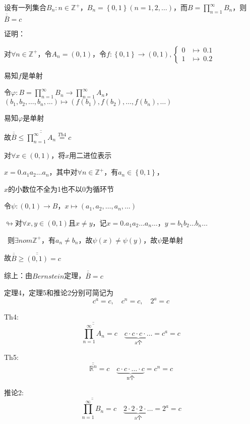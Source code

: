 \begin{la}
设有一列集合$B_{n} : n \in \mathbb{Z}^{+}$，$B_{n} = \left\{0,1\right\} \left(n = 1,2,\dots\right) $，而$B = \prod \limits_{n=1}^{\infty}B_{n}$，则$\overline{\overline{B}} = c$    
\end{la}
\noindent 证明：
\par {} 对$\forall n \in \mathbb{Z}^{+}$，令$A_{n} = \left(0,1\right) $，令$f : \left\{0,1\right\} \to \left(0,1\right) ,
\begin{cases}
    0 &\mapsto \ 0.1  \\
    1 &\mapsto \ 0.2
\end{cases} $
\par 易知$f$是单射
\par 令$\varphi :B = \prod \limits_{n=1}^{\infty}B_{n} \to \prod \limits_{n=1}^{\infty}A_{n}$，$\left( b_{1},b_{2},\dots,b_{n},\dots \right)\mapsto \left(f(b_{1}),f(b_{2}),\dots,f(b_{n}),\dots\right) $
\par 易知$\varphi$是单射
\par 故$\overline{\overline{B}} \leqslant \overline{\overline{\prod \limits_{n=1}^{\infty}A_{n}}} \stackrel{Th4}{=} c$
\par {} 对$\forall x \in \left(0,1\right) $，将$x$用二进位表示
\par \quad $x = 0.a_{1}a_{2}\dots a_{n}$，其中对$\forall n \in \mathbb{Z}^{+}$，有$a_{n} \in \left\{0,1\right\} $，
\par \quad $x$的小数位不全为1也不以0为循环节
\par \quad 令$\psi : \left(0,1\right) \to B$，$x \mapsto \left(a_{1},a_{2},\dots,a_{n},\dots\right) $
\par \quad $\looparrowright $对$\forall x , y \in \left(0,1\right) $且$x \neq y$，记$x = 0.a_{1}a_{2}\dots a_{n}\dots$，$y = b_{1}b_{2}\dots b_{n}\dots$
\par \quad \quad \ 则$\exists n om \mathbb{Z}^{+}$，有$a_{n} \neq b_{n}$，故$\psi (x) \neq \psi (y)$，故$\psi $是单射
\par \quad 故$\overline{\overline{B}} \geqslant \overline{\overline{\left(0,1\right) }} = c$
\par 综上：由$Bernstein$定理，$\overline{\overline{B}} = c$

\begin{wa}
定理4，定理5和推论2分别可简记为
$$ c^{a} = c ,\quad c^{n} = c , \quad 2^{a} = c$$
\end{wa}
\par Th4: $$\overline{\overline{\prod \limits_{n=1}^{\infty}A_{n}}} = c \quad \underbrace{c \cdot c\cdot c\cdot \dots} _\text{a个} = c^{a} = c$$
\par Th5: $$\overline{\overline{\mathbb{R}^{n}}} = c \quad \underbrace{c \cdot c\cdot \dots \cdot c} _\text{n个} = c^{n} = c$$
\par 推论2:$$\overline{\overline{\prod \limits_{n=1}^{\infty}B_{n}}} = c \quad \underbrace{2 \cdot 2\cdot 2\cdot \dots} _\text{a个} = 2^{a} = c$$

